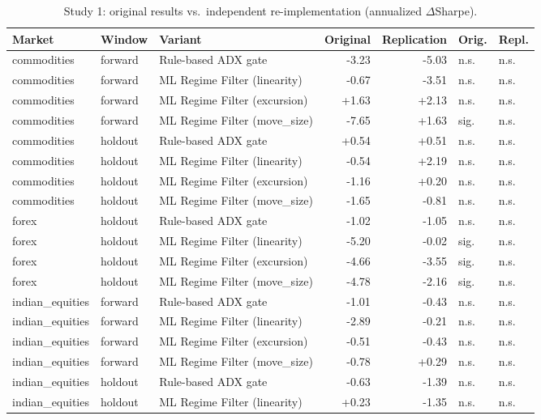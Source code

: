 \begin{longtable}{l l l r r l l}
\caption{Study 1: original results vs.\ independent re-implementation (annualized $\Delta$Sharpe).} \label{tab:s1rep} \\
\toprule
Market & Window & Variant & Original & Replication & Orig. & Repl. \\
\midrule
\endhead
\bottomrule
\endfoot
commodities & forward & Rule-based ADX gate & -3.23 & -5.03 & n.s. & n.s. \\
commodities & forward & ML Regime Filter (linearity) & -0.67 & -3.51 & n.s. & n.s. \\
commodities & forward & ML Regime Filter (excursion) & +1.63 & +2.13 & n.s. & n.s. \\
commodities & forward & ML Regime Filter (move\_size) & -7.65 & +1.63 & sig. & n.s. \\
commodities & holdout & Rule-based ADX gate & +0.54 & +0.51 & n.s. & n.s. \\
commodities & holdout & ML Regime Filter (linearity) & -0.54 & +2.19 & n.s. & n.s. \\
commodities & holdout & ML Regime Filter (excursion) & -1.16 & +0.20 & n.s. & n.s. \\
commodities & holdout & ML Regime Filter (move\_size) & -1.65 & -0.81 & n.s. & n.s. \\
forex & holdout & Rule-based ADX gate & -1.02 & -1.05 & n.s. & n.s. \\
forex & holdout & ML Regime Filter (linearity) & -5.20 & -0.02 & sig. & n.s. \\
forex & holdout & ML Regime Filter (excursion) & -4.66 & -3.55 & sig. & n.s. \\
forex & holdout & ML Regime Filter (move\_size) & -4.78 & -2.16 & sig. & n.s. \\
indian\_equities & forward & Rule-based ADX gate & -1.01 & -0.43 & n.s. & n.s. \\
indian\_equities & forward & ML Regime Filter (linearity) & -2.89 & -0.21 & n.s. & n.s. \\
indian\_equities & forward & ML Regime Filter (excursion) & -0.51 & -0.43 & n.s. & n.s. \\
indian\_equities & forward & ML Regime Filter (move\_size) & -0.78 & +0.29 & n.s. & n.s. \\
indian\_equities & holdout & Rule-based ADX gate & -0.63 & -1.39 & n.s. & n.s. \\
indian\_equities & holdout & ML Regime Filter (linearity) & +0.23 & -1.35 & n.s. & n.s. \\

\end{longtable}
